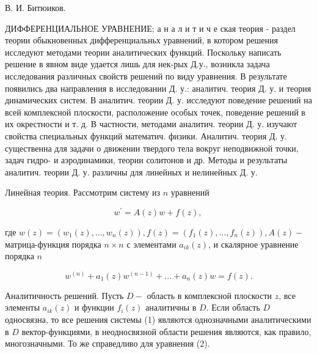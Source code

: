 \documentclass[10pt]{article}
\begin{document}
В. И. Битюиков.



ДИФФЕРЕНЦИАЛЬНОЕ УРАВНЕНИЕ; а н а л и т и ч е ская теория - раздел теории обыкновенных дифференциальньх уравнений, в котором решения исследуют методами теории аналитических функций. Поскольку написать решение в явном виде удается лишь для нек-рых Д.у., возникла задача исследования различных свойств решений по виду уравнения. В результате появились два направления в исследовании Д. у.: аналитич. теория Д. у. и теория динамических систем. В аналитич. теории Д. у. исследуют поведение решений на всей комплексной плоскости, расположение особых точек, поведение решений в их окрестности и т. д. В частности, методами аналитич. теории Д. у. изучают свойства специальных функций математич. физики. Аналитич. теория Д. у. существенна для задачи о движении твердого тела вокруг неподвижной точки, задач гидро- и аэродинамики, теории солитонов и др. Методы и результаты аналитич. теории Д. у. различны для линейных и нелинейных Д. у.



Линейная теория. Рассмотрим систему из $n$ уравнений



\[

w^{\prime}=A(z) w+f(z) \text {, }

\]



где $w(z)=\left(w_{1}(z), \ldots, w_{n}(z)\right), f(z)=\left(f_{1}(z), \ldots, f_{n}(z)\right), A(z)-$ матрица-функция порядка $n \times n$ с элементами $a_{i k}(z)$, и скалярное уравнение порядка $n$



\[

w^{(n)}+a_{1}(z) w^{(n-1)}+\ldots+a_{n}(z) w=f(z) .

\]



Аналитичность решений. Пусть $D-$ область в комплексной плоскости $z$, все элементы $a_{i k}(z)$ и функции $f_{i}(z)$ аналитичны в $D$. Если область $D$ односвязна, то все решения системы (1) являются однозначными аналитическими в $D$ вектор-функциями, в неодносвязной области решения являются, как правило, многозначными. То же справедливо для уравнения (2).
\end{document}
